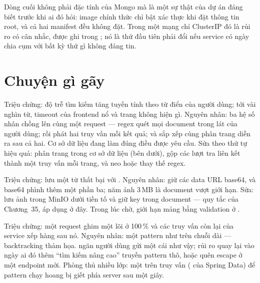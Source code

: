 Dòng cuối không phải đặc tính của Mongo mà là một sự thật của dự án
đáng biết trước khi ai đó hỏi: image chính thức chỉ bật xác thực khi
đặt thông tin root, và cả hai manifest đều không đặt. Trong một mạng
chỉ ClusterIP đó là rủi ro có cân nhắc, được ghi trong
; nó là thứ đầu tiên phải đổi nếu service có ngày
chia cụm với bất kỳ thứ gì không đáng tin.

\section{Chuyện gì gãy}

\begin{pitfall}
Triệu chứng: độ trễ tìm kiếm tăng tuyến tính theo từ điển của người
dùng; tới vài nghìn từ, timeout của frontend nổ và trang không hiện gì.
Nguyên nhân: ba hệ số nhân chồng lên cùng một request --- regex quét
mọi document trong lát của người dùng;  rồi phát hai
truy vấn mỗi kết quả; và sắp xếp cùng phân trang diễn ra sau cả hai. Cơ
sở dữ liệu đang làm đúng điều được yêu cầu. Sửa theo thứ tự hiệu quả:
phân trang trong cơ sở dữ liệu (bên dưới), gộp các lượt tra liên kết
thành một truy vấn  mỗi trang, và neo hoặc thay thế regex.
\end{pitfall}

\begin{pitfall}
Triệu chứng: lưu một từ thất bại với
.
Nguyên nhân:  giữ các data URL base64, và base64 phình
thêm một phần ba; năm ảnh 3\,MB là document vượt giới hạn. Sửa: lưu ảnh
trong MinIO dưới tiền tố  và
giữ key trong document --- quy tắc của Chương~35, áp dụng ở đây. Trong
lúc chờ, giới hạn mảng bằng validation ở
.
\end{pitfall}

\begin{pitfall}
Triệu chứng: một request ghim một lõi ở 100\,\% và các truy vấn còn lại
của service xếp hàng sau nó. Nguyên nhân: một pattern như
 trên chuỗi dài --- backtracking thảm họa.
 ngăn người dùng gửi một cái như vậy; rủi ro quay lại
vào ngày ai đó thêm ``tìm kiếm nâng cao'' truyền pattern thô, hoặc quên
escape ở một endpoint mới. Phòng thủ nhiều lớp: một 
trên truy vấn ( của Spring Data) để
pattern chạy hoang bị giết phía server sau một giây.
\end{pitfall}

